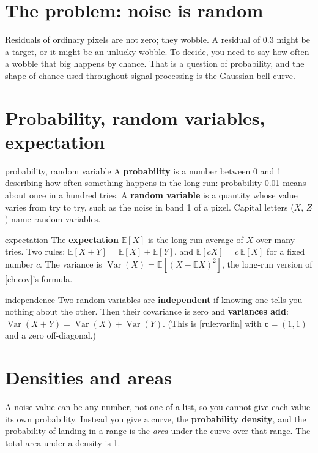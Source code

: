 \documentclass[11pt,a4paper,oneside,openany]{book}
\newcommand{\B}[1]{{\symbf{#1}}}
\newcommand{\B}[1]{{\bm{#1}}}
\newcommand{\E}{\mathbb{E}}
\newcommand{\Var}{\operatorname{Var}}
\newcommand{\vc}{\B{c}}
\begin{document}
\section{The problem: noise is random}

Residuals of ordinary pixels are not zero; they wobble. A residual of 0.3 might be a target, or it might be an unlucky wobble.
To decide, you need to say how often a wobble that big happens by chance. That is a question of probability, and the shape of
chance used throughout signal processing is the Gaussian bell curve.

\section{Probability, random variables, expectation}

\begin{defn}{probability, random variable}
A \textbf{probability} is a number between 0 and 1 describing how often something happens in the long run: probability 0.01
means about once in a hundred tries. A \textbf{random variable} is a quantity whose value varies from try to try, such as the
noise in band 1 of a pixel. Capital letters ($X$, $Z$) name random variables.
\end{defn}

\begin{defn}{expectation}
The \textbf{expectation} $\E[X]$ is the long-run average of $X$ over many tries. Two rules: $\E[X+Y]=\E[X]+\E[Y]$, and
$\E[cX]=c\,\E[X]$ for a fixed number $c$. The variance is $\Var(X)=\E[(X-\E X)^2]$, the long-run version of \cref{ch:cov}'s
formula.
\end{defn}

\begin{defn}{independence}
Two random variables are \textbf{independent} if knowing one tells you nothing about the other. Then their covariance is zero and
\textbf{variances add}: $\Var(X+Y)=\Var(X)+\Var(Y)$. (This is \cref{rule:varlin} with $\vc=(1,1)$ and a zero off-diagonal.)
\end{defn}

\section{Densities and areas}

A noise value can be any number, not one of a list, so you cannot give each value its own probability. Instead you give a
curve, the \textbf{probability density}, and the probability of landing in a range is the \emph{area} under the curve over that
range. The total area under a density is 1.
\end{document}
